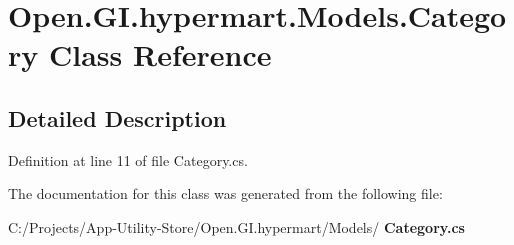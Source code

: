 \section{Open.\+G\+I.\+hypermart.\+Models.\+Category Class Reference}
\label{class_open_1_1_g_i_1_1hypermart_1_1_models_1_1_category}


 




\subsection{Detailed Description}




Definition at line 11 of file Category.\+cs.



The documentation for this class was generated from the following file\+:\begin{DoxyCompactItemize}
\item 
C\+:/\+Projects/\+App-\/\+Utility-\/\+Store/\+Open.\+G\+I.\+hypermart/\+Models/\textbf{ Category.\+cs}\end{DoxyCompactItemize}
